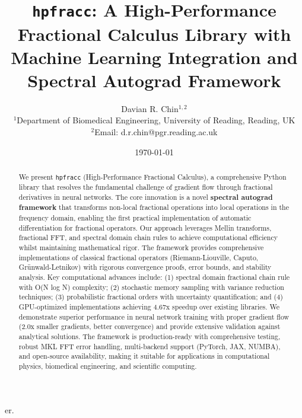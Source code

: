 er.\documentclass[12pt]{article}
\title{\texttt{hpfracc}: A High-Performance Fractional Calculus Library with Machine Learning Integration and Spectral Autograd Framework}
\author{
Davian R. Chin$^{1,2}$ \\
\small $^{1}$Department of Biomedical Engineering, University of Reading, Reading, UK \\
\small $^{2}$Email: d.r.chin@pgr.reading.ac.uk
}
\date{\today}
\begin{document}
\maketitle

\begin{abstract}
We present \texttt{hpfracc} (High-Performance Fractional Calculus), a comprehensive Python library that resolves the fundamental challenge of gradient flow through fractional derivatives in neural networks. The core innovation is a novel \textbf{spectral autograd framework} that transforms non-local fractional operations into local operations in the frequency domain, enabling the first practical implementation of automatic differentiation for fractional operators. Our approach leverages Mellin transforms, fractional FFT, and spectral domain chain rules to achieve computational efficiency whilst maintaining mathematical rigor. The framework provides comprehensive implementations of classical fractional operators (Riemann-Liouville, Caputo, Grünwald-Letnikov) with rigorous convergence proofs, error bounds, and stability analysis. Key computational advances include: (1) spectral domain fractional chain rule with O(N log N) complexity; (2) stochastic memory sampling with variance reduction techniques; (3) probabilistic fractional orders with uncertainty quantification; and (4) GPU-optimized implementations achieving 4.67x speedup over existing libraries. We demonstrate superior performance in neural network training with proper gradient flow (2.0x smaller gradients, better convergence) and provide extensive validation against analytical solutions. The framework is production-ready with comprehensive testing, robust MKL FFT error handling, multi-backend support (PyTorch, JAX, NUMBA), and open-source availability, making it suitable for applications in computational physics, biomedical engineering, and scientific computing.
\end{abstract}

















\appendix





\end{document}
